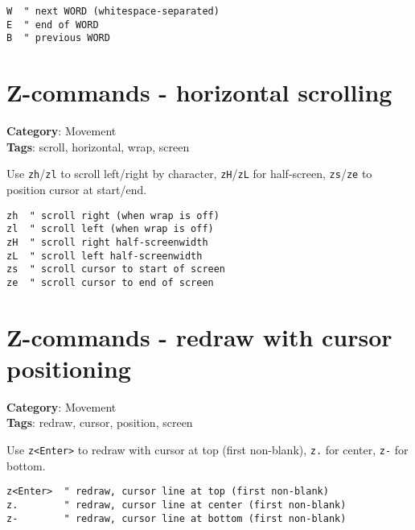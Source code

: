 {{{{{{{{\begin{Exa*}{}
\begin{Verbatim}[fontsize=\footnotesize, breaklines, breakanywhere]
W  " next WORD (whitespace-separated)
E  " end of WORD
B  " previous WORD
\end{Verbatim}
\end{Exa*}

\section{Z-commands - horizontal scrolling}

\textbf{Category}: Movement\\ \textbf{Tags}: scroll, horizontal, wrap, screen
\vspace{0.5cm}

Use {\footnotesize \Verb§zh§}/{\footnotesize \Verb§zl§} to scroll left/right by character, {\footnotesize \Verb§zH§}/{\footnotesize \Verb§zL§} for half-screen, {\footnotesize \Verb§zs§}/{\footnotesize \Verb§ze§} to position cursor at start/end.

\begin{Exa*}{}
\begin{Verbatim}[fontsize=\footnotesize, breaklines, breakanywhere]
zh  " scroll right (when wrap is off)
zl  " scroll left (when wrap is off)
zH  " scroll right half-screenwidth
zL  " scroll left half-screenwidth
zs  " scroll cursor to start of screen
ze  " scroll cursor to end of screen
\end{Verbatim}
\end{Exa*}

\section{Z-commands - redraw with cursor positioning}

\textbf{Category}: Movement\\ \textbf{Tags}: redraw, cursor, position, screen
\vspace{0.5cm}

Use {\footnotesize \Verb§z<Enter>§} to redraw with cursor at top (first non-blank), {\footnotesize \Verb§z.§} for center, {\footnotesize \Verb§z-§} for bottom.

\begin{Exa*}{}
\begin{Verbatim}[fontsize=\footnotesize, breaklines, breakanywhere]
z<Enter>  " redraw, cursor line at top (first non-blank)
z.        " redraw, cursor line at center (first non-blank)  
z-        " redraw, cursor line at bottom (first non-blank)
\end{Verbatim}
\end{Exa*}

}}}}}}}}
